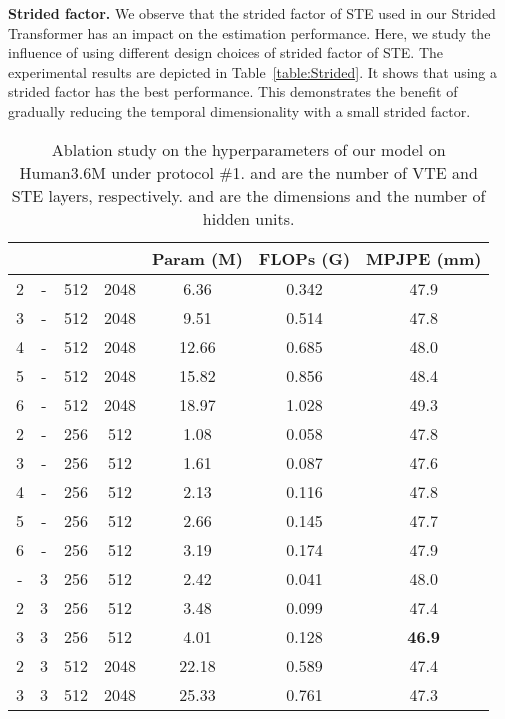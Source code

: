 \documentclass[journal]{IEEEtran}
\begin{document}
\textbf{Strided factor.}
We observe that the strided factor of STE used in our Strided Transformer has an impact on the estimation performance. 
Here, we study the influence of using different design choices of strided factor of STE. 
The experimental results are depicted in Table~\ref{table:Strided}.
It shows that using a strided factor  has the best performance. 
This demonstrates the benefit of gradually reducing the temporal dimensionality with a small strided factor. 

\begin{table}[tb]
   \centering
   \caption
   {
      Ablation study on the hyperparameters of our model on Human3.6M under protocol \#1. 
       and  are the number of VTE and STE layers, respectively. 
       and  are the dimensions and the number of hidden units. 
   }
   \setlength{\tabcolsep}{1.8mm} 
   \begin{tabular}{ccccccc}
   \toprule  [1pt]
    & & & &Param (M) &FLOPs (G)  &MPJPE (mm)\\
   \midrule  [0.5pt]
   2 &- &512 &2048 &6.36 &0.342  &47.9 \\
   3 &- &512 &2048 &9.51 &0.514  &47.8 \\
   4 &- &512 &2048 &12.66 &0.685 &48.0 \\
   5 &- &512 &2048 &15.82 &0.856 &48.4 \\
   6 &- &512 &2048 &18.97 &1.028 &49.3 \\
   \midrule [0.5pt]  

   2 &- &256 &512 &1.08 &0.058 &47.8 \\
   3 &- &256 &512 &1.61 &0.087 &47.6 \\
   4 &- &256 &512 &2.13 &0.116 &47.8 \\
   5 &- &256 &512 &2.66 &0.145 &47.7 \\
   6 &- &256 &512 &3.19 &0.174 &47.9 \\
   \midrule [0.5pt]  

   - &3 &256 &512 &2.42 &0.041 &48.0 \\
   2 &3 &256 &512 &3.48 &0.099 &47.4 \\
   3 &3 &256 &512 &4.01 &0.128 &\textbf{46.9} \\
   2 &3 &512 &2048 &22.18 &0.589 &47.4 \\
   3 &3 &512 &2048 &25.33 &0.761 &47.3 \\
   \toprule  [1.0pt] 
   \end{tabular}
\label{table:hyperparameters}
\end{table}
\end{document}
